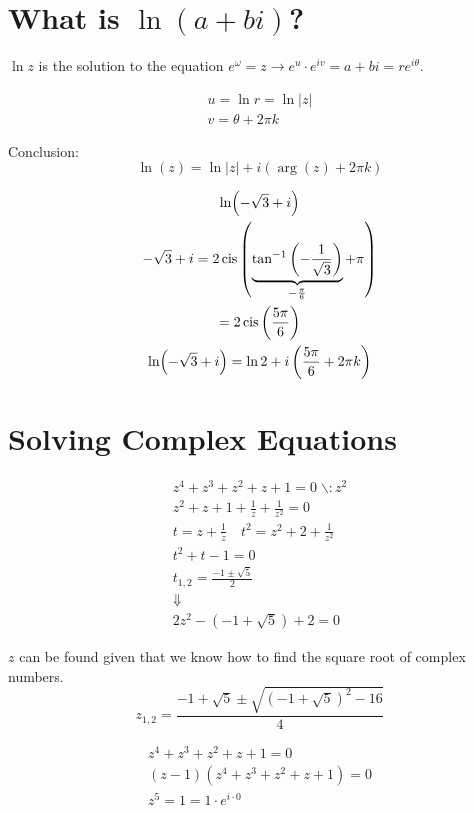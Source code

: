 \documentclass[00_complete]{subfiles}
\begin{document}
\section{What is \texorpdfstring{$\ln(a+bi)$}{ln(a+bi)}?}

\(\ln z\) is the solution to the equation
\(e^\omega=z \to e^u \cdot e^{iv}=a+bi = re^{i\theta}\).

\[
\begin{gathered}
    u = \ln r = \ln|z| \\
    v= \theta +2\pi k
\end{gathered}
\]

Conclusion: \[
\ln(z) = \ln|z|+i(\arg(z)+2\pi k)
\]

\begin{example}
\[
\begin{gathered}
    \ln(- \sqrt 3 + i)\\
    -\sqrt 3 + i =2 \operatorname{cis}\left(\underbrace{\tan^{-1}\left(-\frac{1}{\sqrt 3}\right)}_{-\frac{\pi}{6}}+\pi\right) \\
    =2 \operatorname{cis}\left(\frac{5\pi}{6}\right) \\
    \ln(-\sqrt 3+i) = \ln 2 + i \left(\frac{5\pi}{6} + 2 \pi k\right)
\end{gathered}
\]
\end{example}

\section{Solving Complex Equations}

\[
\begin{gathered}
    z^4+z^3+z^2+z +1 = 0 \;\backslash : z^2 \\
    z^2+z +1 + \frac{1}{z} + \frac{1}{z^2} = 0 \\
    t = z + \frac{1}{z} \quad t^2 = z^2 +2 + \frac{1}{z^2} \\
    t^2 + t - 1= 0 \\
    t_{1,2} = \frac{-1 \pm \sqrt 5}{2} \\
    \Downarrow \\
    2z^2 -(-1 + \sqrt 5) + 2 = 0
\end{gathered}
\]

\(z\) can be found given that we know how to find the square root of
complex numbers. \[
    z_{1,2} = \frac{-1 + \sqrt 5 \pm \sqrt{(-1+\sqrt 5)^2-16}}{4}
\]

\[
\begin{gathered}
z^4+z^3+z^2+z+1 = 0 \\
(z-1)(z^4+z^3+z^2+z+1)=0 \\
z^5 = 1 = \boxed{1 \cdot e^{i \cdot 0}}
\end{gathered}
\]
\end{document}

